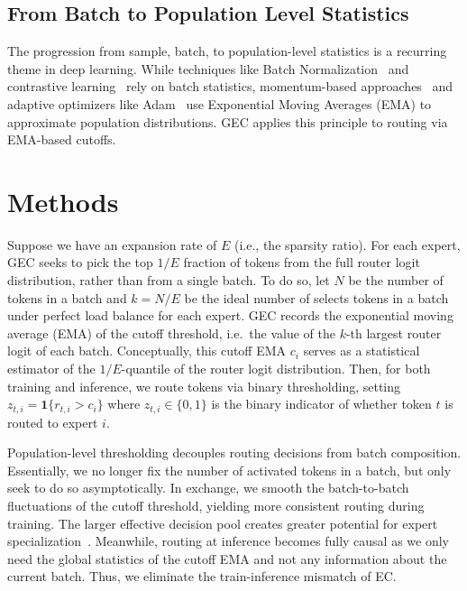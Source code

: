 \documentclass{article}
\theoremstyle{plain}
\theoremstyle{definition}
\theoremstyle{remark}
\begin{document}
\subsection{From Batch to Population Level Statistics}

The progression from sample, batch, to population-level statistics is a recurring theme in deep learning. While techniques like Batch Normalization~\cite{ioffe2015batch} and contrastive learning~\cite{radford2021learning} rely on batch statistics, momentum-based approaches~\cite{he2020momentum,caron2021emerging} and adaptive optimizers like Adam~\cite{kingma2015adam} use Exponential Moving Averages (EMA) to approximate population distributions. 
GEC applies this principle to routing via EMA-based cutoffs.

\section{Methods}


Suppose we have an expansion rate of $E$ (i.e., the sparsity ratio). For each expert, GEC seeks to pick the top $1/E$ fraction of tokens from the full router logit distribution, rather than from a single batch. To do so, let $N$ be the number of tokens in a batch and $k = N/E$ be the ideal number of selects tokens in a batch under perfect load balance for each expert. GEC records the exponential moving average (EMA) of the cutoff threshold, i.e.\ the value of the $k$-th largest router logit of each batch.
Conceptually, this cutoff EMA $c_i$ serves as a statistical estimator of the $1/E$-quantile of the router logit distribution.
Then, for both training and inference, we route tokens via binary thresholding, setting $z_{t,i}=\mathbf{1}\{r_{t,i}>c_i\}$ where $z_{t,i}\in \{0,1\}$ is the binary indicator of whether token $t$ is routed to expert $i$.

Population-level thresholding decouples routing decisions from batch composition. Essentially, we no longer fix the number of activated tokens in a batch, but only seek to do so asymptotically. In exchange, we smooth the batch-to-batch fluctuations of the cutoff threshold, yielding more consistent routing during training. The larger effective decision pool creates greater potential for expert specialization~\cite{qiu2025demonsdetailimplementingload}. Meanwhile, routing at inference becomes fully causal as we only need the global statistics of the cutoff EMA and not any information about the current batch. Thus, we eliminate the train-inference mismatch of EC.
\end{document}

